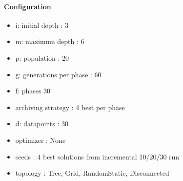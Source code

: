 \paragraph{Configuration}
\begin{itemize}
\item i: initial depth : 3
\item m: maximum depth : 6
\item p: population : 20
\item g: generations per phase : 60
\item f: phases 30
\item archiving strategy : 4 best per phase
\item d: datapoints : 30
\item optimizer : None
\item seeds : 4 best solutions from incremental 10/20/30 run
\item topology : Tree, Grid, RandomStatic, Disconnected
\end{itemize}
